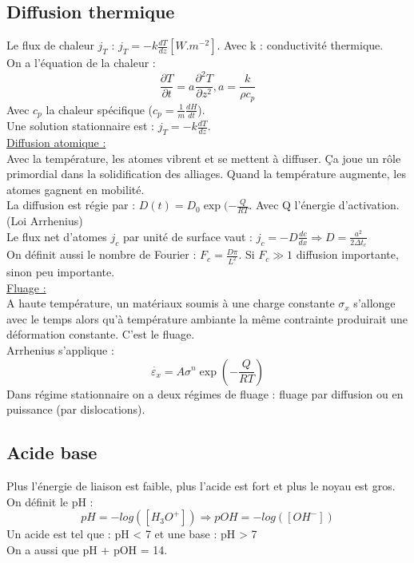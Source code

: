 \documentclass[../main.tex]{subfiles}
\begin{document}
\subsection{Diffusion thermique}
Le flux de chaleur $j_T$ : $j_T = -k\frac{dT}{dz} [W.m^{-2}]$. Avec k : conductivité thermique.\\
On a l'équation de la chaleur :\\
\begin{equation}
    \frac{\partial T }{\partial t} = a \frac{\partial^2T}{\partial z^2}, a=\frac{k}{\rho c_p}
\end{equation}
Avec $c_p$ la chaleur spécifique ($c_p = \frac{1}{m} \frac{dH}{dt}$).\\
Une solution stationnaire est : $j_T = -k \frac{dT}{dz}$.\\

\quad \underline{Diffusion atomique :}\\
Avec la température, les atomes vibrent et se mettent à diffuser. Ça joue un rôle primordial dans la solidification des alliages. Quand la température augmente, les atomes gagnent en mobilité. \\
La diffusion est régie par : $D(t) = D_0 \exp(-\frac{Q}{RT}$. Avec Q l'énergie d'activation.(Loi Arrhenius)\\
Le flux net d'atomes $j_c$ par unité de surface vaut : $j_c = -D\frac{dc}{dx} \Rightarrow D = \frac{a^2}{2 \Delta t_c}$\\
On définit aussi le nombre de Fourier : $F_c = \frac{D\pi}{L^2}$. Si $F_c \gg 1$ diffusion importante, sinon peu importante.\\

\quad \underline{Fluage :}\\
A haute température, un matériaux soumis à une charge constante $\sigma_x$ s'allonge avec le temps alors qu'à température ambiante la même contrainte produirait une déformation constante. C'est le fluage.\\
Arrhenius s'applique : \\
\begin{equation}
    \dot{\varepsilon_x} = A \sigma^n \exp(-\frac{Q}{RT})
\end{equation}
Dans régime stationnaire on a deux régimes de fluage : fluage par diffusion ou en puissance (par dislocations).\\

\subsection{Acide base}
Plus l'énergie de liaison est faible, plus l'acide est fort et plus le noyau est gros. \\
On définit le pH :\\
\begin{equation}
    pH = -log([H_3O^+]) \Rightarrow pOH = -log([OH^-])
\end{equation}
Un acide est tel que : pH < 7 et une base : pH > 7\\
On a aussi que pH + pOH = 14.\\
\end{document}
